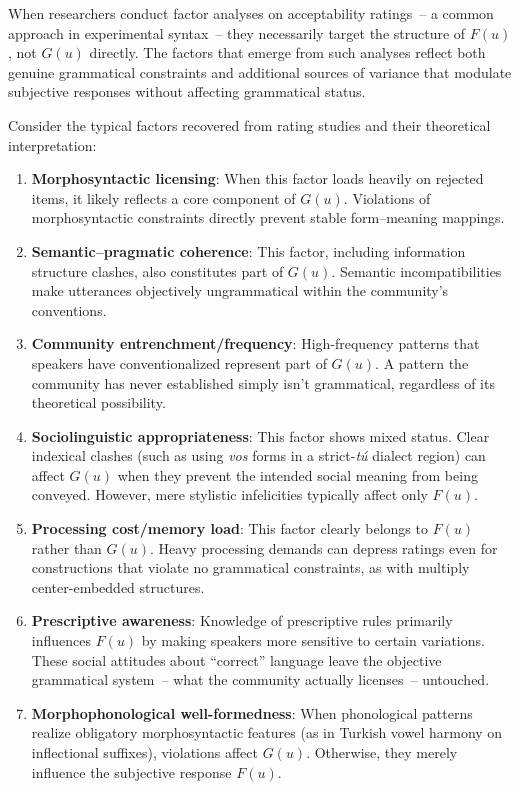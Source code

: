 \documentclass[12pt,letterpaper]{article}
\begin{document}
When researchers conduct factor analyses on acceptability ratings~-- a common approach in experimental syntax~-- they necessarily target the structure of $F(u)$, not $G(u)$ directly. The factors that emerge from such analyses reflect both genuine grammatical constraints and additional sources of variance that modulate subjective responses without affecting grammatical status.

Consider the typical factors recovered from rating studies and their theoretical interpretation:

\begin{enumerate}
\item \textbf{Morphosyntactic licensing}: When this factor loads heavily on rejected items, it likely reflects a core component of $G(u)$. Violations of morphosyntactic constraints directly prevent stable form--meaning mappings.

\item \textbf{Semantic--pragmatic coherence}: This factor, including information structure clashes, also constitutes part of $G(u)$. Semantic incompatibilities make utterances objectively ungrammatical within the community's conventions.

\item \textbf{Community entrenchment/frequency}: High-frequency patterns that speakers have conventionalized represent part of $G(u)$. A pattern the community has never established simply isn't grammatical, regardless of its theoretical possibility.

\item \textbf{Sociolinguistic appropriateness}: This factor shows mixed status. Clear indexical clashes (such as using \textit{vos} forms in a strict-\textit{tú} dialect region) can affect $G(u)$ when they prevent the intended social meaning from being conveyed. However, mere stylistic infelicities typically affect only $F(u)$.

\item \textbf{Processing cost/memory load}: This factor clearly belongs to $F(u)$ rather than $G(u)$. Heavy processing demands can depress ratings even for constructions that violate no grammatical constraints, as with multiply center-embedded structures.

\item \textbf{Prescriptive awareness}: Knowledge of prescriptive rules primarily influences $F(u)$ by making speakers more sensitive to certain variations. These social attitudes about ``correct'' language leave the objective grammatical system~-- what the community actually licenses~-- untouched.

\item \textbf{Morphophonological well-formedness}: When phonological patterns realize obligatory morphosyntactic features (as in Turkish vowel harmony on inflectional suffixes), violations affect $G(u)$. Otherwise, they merely influence the subjective response $F(u)$.
\end{enumerate}
\end{document}
